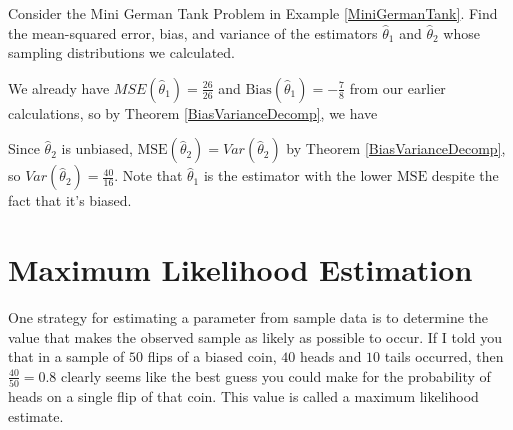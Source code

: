 \begin{examp} Consider the Mini German Tank Problem in Example \ref{MiniGermanTank}. Find the mean-squared error, bias, and variance of the estimators $\widehat{\theta}_1$ and $\widehat{\theta}_2$ whose sampling distributions we calculated.
\par
\noindent We already have $MSE(\widehat{\theta}_1) =\frac{26}{26}$ and $\text{Bias}(\widehat{\theta}_1) =-\frac{7}{8}$ from our earlier calculations, so by Theorem \ref{BiasVarianceDecomp}, we have
\par
\noindent Since $\widehat{\theta}_2$ is unbiased, $\text{MSE}(\widehat{\theta}_2) = Var(\widehat{\theta}_2)$ by Theorem \ref{BiasVarianceDecomp}, so $Var(\widehat{\theta}_2) = \frac{40}{16}$. Note that $\widehat{\theta}_1$ is the estimator with the lower $\text{MSE}$ despite the fact that it's biased.
\end{examp}

\section{Maximum Likelihood Estimation}

One strategy for estimating a parameter from sample data is to determine the value that makes the observed sample as likely as possible to occur. If I told you that in a sample of $50$ flips of a biased coin, $40$ heads and $10$ tails occurred, then $\frac{40}{50} = 0.8$ clearly seems like the best guess you could make for the probability of heads on a single flip of that coin. This value is called a maximum likelihood estimate.


